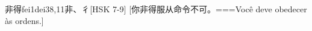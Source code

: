 \begin{EntryWithPhonetic}{非得}{fei1dei3}{8,11}{⾮、⼻}[HSK 7-9]
  [你非得服从命令不可。===Você deve obedecer às ordens.]
\end{EntryWithPhonetic}
